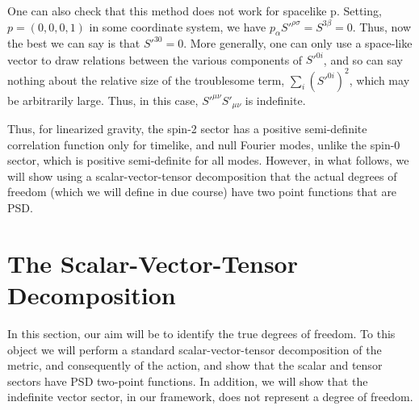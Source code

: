 \documentclass[aps,preprintnumbers,superscriptaddress,longbibliography]{revtex4-1}
\begin{document}
One can also check that this method does not work for spacelike p. Setting, $p=(0,0,0,1)$ in some coordinate system, we have $p_\alpha S'^{\rho\sigma}=S^{3\beta}=0$. Thus, now the best we can say is that $S'^{30}=0$. More generally, one can only use a space-like vector to draw relations between the various components of $S'^{0i}$, and so can say nothing about the relative size of the troublesome term, $\sum_i(S'^{0i})^2$, which may be arbitrarily large. Thus, in this case, $S'^{\mu\nu}S'_{\mu\nu} $ is indefinite.

Thus, for linearized gravity, the spin-2 sector has a positive semi-definite correlation function only for timelike, and null Fourier modes, unlike the spin-0 sector, which is positive semi-definite for all modes. However, in what follows, we will show using a scalar-vector-tensor decomposition that the actual degrees of freedom (which we will define in due course) have two point functions that are PSD.




\section{The Scalar-Vector-Tensor Decomposition}
\label{SVT}
In this section, our aim will be to identify the true degrees of freedom. To this object we will perform a standard scalar-vector-tensor decomposition of the metric, and consequently of the action, and show that the scalar and tensor sectors have PSD two-point functions. In addition, we will show that the indefinite vector sector, in our framework, does not represent a degree of freedom.
\end{document}
